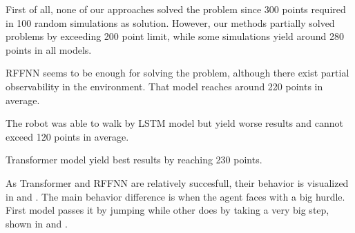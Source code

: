 First of all, none of our approaches solved the problem since 300 points required in 100 random simulations as solution. 
However, our methods partially solved problems by exceeding 200 point limit, while some simulations yield around 280 points in all models. 

RFFNN seems to be enough for solving the problem, although there exist partial observability in the environment. 
That model reaches around 220 points in average. 

The robot was able to walk by LSTM model but yield worse results and cannot exceed 120 points in average. 

Transformer model yield best results by reaching 230 points. 

As Transformer and RFFNN are relatively succesfull, their behavior is visualized in  and . 
The main behavior difference is when the agent faces with a big hurdle. 
First model passes it by jumping while other does by taking a very big step, shown in  and .

